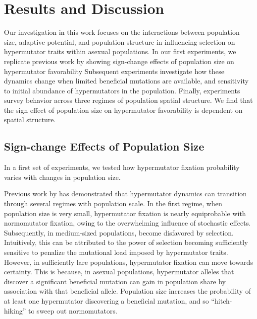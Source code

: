 \section{Results and Discussion} \label{sec:results}

Our investigation in this work focuses on the interactions between population size, adaptive potential, and population structure in influencing selection on hypermutator traits within asexual populations.
In our first experiments, we replicate previous work by \citet{raynes2018sign} showing sign-change effects of population size on hypermutator favorability
Subsequent experiments investigate how these dynamics change when limited beneficial mutations are available, and sensitivity to initial abundance of hypermutators in the population.
Finally, experiments survey behavior across three regimes of population spatial structure.
We find that the sign effect of population size on hypermutator favorability is dependent on spatial structure.

\subsection{Sign-change Effects of Population Size}

In a first set of experiments, we tested how hypermutator fixation probability varies with changes in population size.

Previous work by \citet{raynes2018sign} has demonstrated that hypermutator dynamics can transition through several regimes with population scale.
In the first regime, when population size is very small, hypermutator fixation is nearly equiprobable with normomutator fixation, owing to the overwhelming influence of stochastic effects.
Subsequently, in medium-sized populations, become disfavored by selection.
Intuitively, this can be attributed to the power of selection becoming sufficiently sensitive to penalize the mutational load imposed by hypermutator traits.
However, in sufficiently lare populations, hypermutator fixation can move towards certainty.
This is because, in asexual populations, hypermutator alleles that discover a significant beneficial mutation can gain in population share by association with that beneficial allele.
Population size increases the probability of at least one hypermutator discovering a beneficial mutation, and so ``hitch-hiking'' to sweep out normomutators.



